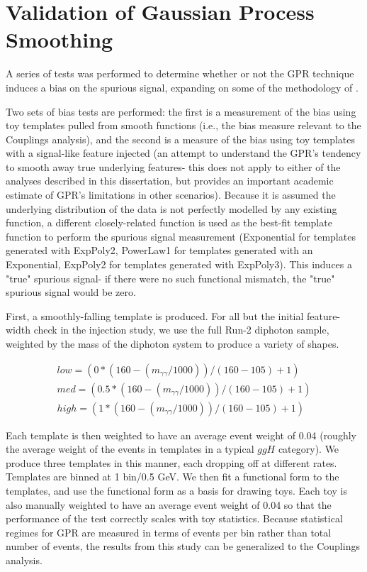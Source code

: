 \section{Validation of Gaussian Process Smoothing}
\label{sec:GPR_validation}
A series of tests was performed to determine whether or not the GPR technique induces a bias on the spurious signal, expanding on some of the methodology of \cite{Hyneman}.

Two sets of bias tests are performed: the first is a measurement of the bias using toy templates pulled from smooth functions (i.e., the bias measure relevant to the Couplings analysis), and the second is a measure of the bias using toy templates with a signal-like feature injected (an attempt to understand the GPR's tendency to smooth away true underlying features- this does not apply to either of the analyses described in this dissertation, but provides an important academic estimate of GPR's limitations in other scenarios). Because it is assumed the underlying distribution of the data is not perfectly modelled by any existing function, a different closely-related function is used as the best-fit template function to perform the spurious signal measurement (Exponential for templates generated with ExpPoly2, PowerLaw1 for templates generated with an Exponential, ExpPoly2 for templates generated with ExpPoly3). This induces a "true" spurious signal- if there were no such functional mismatch, the "true" spurious signal would be zero.

First, a smoothly-falling template is produced. For all but the initial feature-width check in the injection study, we use the full Run-2 \SHERPA diphoton sample, weighted by the mass of the diphoton system to produce a variety of shapes.

\begin{equation}
\begin{split}
low = (0*(160-(m_{\gamma\gamma}/1000))/(160-105)+1) \\
med = (0.5*(160-(m_{\gamma\gamma}/1000))/(160-105)+1) \\
high= (1*(160-(m_{\gamma\gamma}/1000))/(160-105)+1)
\end{split}
\end{equation}

Each template is then weighted to have an average event weight of 0.04 (roughly the average weight of the events in templates in a typical $ggH$ category). We produce three templates in this manner, each dropping off at different rates. Templates are binned at 1 bin/0.5 GeV. We then fit a functional form to the templates, and use the functional form as a basis for drawing toys.  Each toy is also manually weighted to have an average event weight of 0.04 so that the performance of the test correctly scales with toy statistics. Because statistical regimes for GPR are measured in terms of events per bin rather than total number of events, the results from this study can be generalized to the Couplings analysis. 

